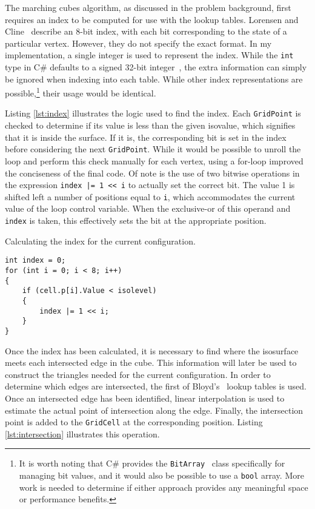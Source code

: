 \documentclass[pageno]{jpaper}
\begin{document}
The marching cubes algorithm, as discussed in the problem background, first requires an index to be computed for use with the lookup tables. Lorensen and Cline~\cite{lorensen} describe an 8-bit index, with each bit corresponding to the state of a particular vertex. However, they do not specify the exact format. In my implementation, a single integer is used to represent the index. While the \texttt{int} type in C\# defaults to a signed 32-bit integer~\cite{integer}, the extra information can simply be ignored when indexing into each table. While other index representations are possible,\footnote{It is worth noting that C\# provides the \texttt{BitArray}~\cite{bitarray} class specifically for managing bit values, and it would also be possible to use a \texttt{bool} array. More work is needed to determine if either approach provides any meaningful space or performance benefits.} their usage would be identical.

Listing \ref{lst:index} illustrates the logic used to find the index. Each \texttt{GridPoint} is checked to determine if its value is less than the given isovalue, which signifies that it is inside the surface. If it is, the corresponding bit is set in the index before considering the next \texttt{GridPoint}. While it would be possible to unroll the loop and perform this check manually for each vertex, using a for-loop improved the conciseness of the final code. Of note is the use of two bitwise operations in the expression \texttt{index |= 1 << i} to actually set the correct bit. The value 1 is shifted left a number of positions equal to \texttt{i}, which accommodates the current value of the loop control variable. When the exclusive-or of this operand and \texttt{index} is taken, this effectively sets the bit at the appropriate position.

\begin{listing}[H]
\linespread{1.0}
\caption{Calculating the index for the current configuration.}
\begin{verbatim}
int index = 0;
for (int i = 0; i < 8; i++)
{
    if (cell.p[i].Value < isolevel)
    {
        index |= 1 << i;
    }
}
\end{verbatim}
\label{lst:index}
\end{listing}

Once the index has been calculated, it is necessary to find where the isosurface meets each intersected edge in the cube. This information will later be used to construct the triangles needed for the current configuration. In order to determine which edges are intersected, the first of Bloyd's~\cite{bloyd} lookup tables is used. Once an intersected edge has been identified, linear interpolation is used to estimate the actual point of intersection along the edge. Finally, the intersection point is added to the \texttt{GridCell} at the corresponding position. Listing \ref{lst:intersection} illustrates this operation.
\end{document}
